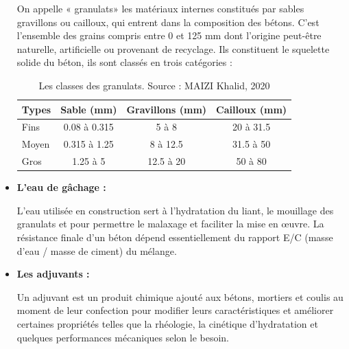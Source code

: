 \documentclass[12pt,a4paper]{report}
\numberwithin{equation}{section}
\begin{document}
\begin{itemize}
		\subitem On appelle « granulats» les matériaux internes constitués par sables gravillons ou cailloux,
		qui entrent dans la composition des bétons. C'est l'ensemble des grains compris entre 0 et 125
		mm dont l'origine peut-être naturelle, artificielle ou provenant de recyclage. Ils constituent le
		squelette solide du béton, ils sont classés en trois catégories :
		
		
		
		\begin{table}[H]
			\centering
			\caption{Les classes des granulats. Source : MAIZI Khalid, 2020\protect\footnotemark[3]}
			\begin{tabular}{lccc}
				\toprule
				Types \hspace{0.5cm} & Sable (mm) & Gravillons (mm) & Cailloux (mm) \\
				\midrule
				Fins & 0.08 à 0.315 & 5 à 8 & 20 à 31.5 \\
				\midrule
				Moyen & 0.315 à 1.25 & 8 à 12.5 & 31.5 à 50 \\
				\midrule
				Gros & 1.25 à 5& 12.5 à 20 & 50 à 80 \\
				\bottomrule
			\end{tabular}
			\label{tab:classes-granulats}
		\end{table}
		
		
		\item \textbf{L'eau de gâchage :}
		
		\subitem L'eau utilisée en construction sert à l’hydratation du liant, le mouillage des granulats et pour permettre le malaxage et faciliter la mise en œuvre. La résistance finale d'un béton dépend essentiellement du rapport E/C (masse d'eau / masse de ciment) du mélange.
		
		\vspace{\baselineskip}
		
		\item \textbf{Les adjuvants :}
		
		\subitem Un adjuvant est un produit chimique ajouté aux bétons, mortiers et coulis au moment de leur
		confection pour modifier leurs caractéristiques et améliorer certaines propriétés telles que la
		rhéologie, la cinétique d’hydratation et quelques performances mécaniques selon le besoin.
		
		
	\end{itemize}
	
	
	
\end{document}

